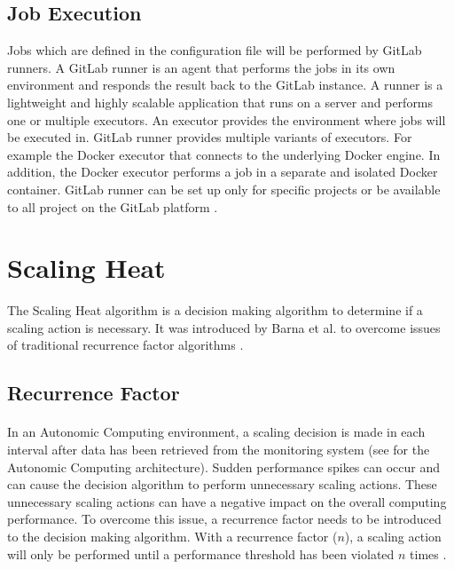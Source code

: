 \subsection{Job Execution}
\label{sec:04_background_gitlab_job}
Jobs which are defined in the configuration file will be performed by GitLab runners.
A GitLab runner is an agent that performs the jobs in its own environment and responds the result back to the GitLab instance. A runner is a lightweight and highly scalable application that runs on a server and performs one or multiple executors.
An executor provides the environment where jobs will be executed in. GitLab runner provides multiple variants of executors.
For example the Docker executor that connects to the underlying Docker engine. In addition, the Docker executor performs a job in a separate and isolated Docker container.
GitLab runner can be set up only for specific projects or be available to all project on the GitLab platform \cite{Gitlab2020Docs}.


\section{Scaling Heat}
\label{sec:04_scal-heat}
The Scaling Heat algorithm is a decision making algorithm to determine if a scaling action is necessary.
It was introduced by Barna et al. \cite{Barna2017ElasticContainerApps} to overcome issues of traditional recurrence factor algorithms \cite{Barna2017ElasticContainerApps}.


\subsection{Recurrence Factor}
\paragraph{}In an Autonomic Computing environment, a scaling decision is made in each interval after data has been retrieved from the monitoring system (see  for the Autonomic Computing architecture). 
Sudden performance spikes can occur and can cause the decision algorithm to perform unnecessary scaling actions.
These unnecessary scaling actions can have a negative impact on the overall computing performance.
To overcome this issue, a recurrence factor needs to be introduced to the decision making algorithm.
With a recurrence factor ($n$), a scaling action will only be performed until a performance threshold has been violated $n$ times \cite{Barna2017ElasticContainerApps}.


